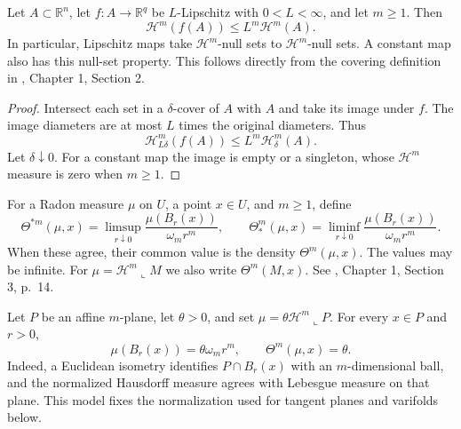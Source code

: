 \begin{proposition}\label{prop:lipschitz-measure}
Let $A\subset\mathbb{R}^n$, let $f:A\to\mathbb{R}^q$ be $L$-Lipschitz with $0<L<\infty$, and let $m\geq1$. Then
\[
 \mathcal{H}^m(f(A))\leq L^m\mathcal{H}^m(A).
\]
In particular, Lipschitz maps take $\mathcal{H}^m$-null sets to $\mathcal{H}^m$-null sets. A constant map also has this null-set property. This follows directly from the covering definition in \cite{Sim18}, Chapter 1, Section 2.
\end{proposition}
\begin{proof}
Intersect each set in a $\delta$-cover of $A$ with $A$ and take its image under $f$. The image diameters are at most $L$ times the original diameters. Thus
\[
 \mathcal{H}^m_{L\delta}(f(A))\leq L^m\mathcal{H}^m_\delta(A).
\]
Let $\delta\downarrow0$. For a constant map the image is empty or a singleton, whose $\mathcal{H}^m$ measure is zero when $m\geq1$.
\end{proof}

\begin{definition}[Density]\label{def:density}
For a Radon measure $\mu$ on $U$, a point $x\in U$, and $m\geq1$, define
\[
 \Theta^{*m}(\mu,x)=\limsup_{r\downarrow0}\frac{\mu(B_r(x))}{\omega_m r^m},
 \qquad
 \Theta_*^m(\mu,x)=\liminf_{r\downarrow0}\frac{\mu(B_r(x))}{\omega_m r^m}.
\]
When these agree, their common value is the density $\Theta^m(\mu,x)$. The values may be infinite. For $\mu=\mathcal{H}^m\llcorner M$ we also write $\Theta^m(M,x)$. See \cite{Sim18}, Chapter 1, Section 3, p.~14.
\end{definition}

\begin{example}\label{ex:plane-density}
Let $P$ be an affine $m$-plane, let $\theta>0$, and set $\mu=\theta\mathcal{H}^m\llcorner P$. For every $x\in P$ and $r>0$,
\[
 \mu(B_r(x))=\theta\omega_mr^m,\qquad \Theta^m(\mu,x)=\theta.
\]
Indeed, a Euclidean isometry identifies $P\cap B_r(x)$ with an $m$-dimensional ball, and the normalized Hausdorff measure agrees with Lebesgue measure on that plane. This model fixes the normalization used for tangent planes and varifolds below.
\end{example}
